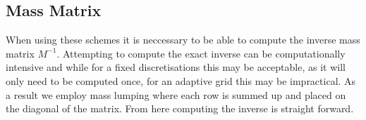 \subsection{Mass Matrix}
When using these schemes it is neccessary to be able to compute the inverse mass matrix $M^{-1}$.
Attempting to compute the exact inverse can be computationally intensive and while for a fixed discretisations this may be acceptable, as it will only need to be computed once, for an adaptive grid this may be impractical.
As a result we employ mass lumping where each row is summed up and placed on the diagonal of the matrix.
From here computing the inverse is straight forward.


